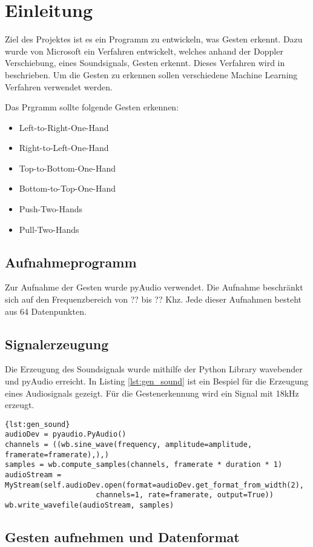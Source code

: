 \section{Einleitung}
Ziel des Projektes ist es ein Programm zu entwickeln, was Gesten erkennt. Dazu wurde von Microsoft ein Verfahren entwickelt, welches anhand der Doppler Verschiebung, eines Soundsignals, Gesten erkennt. Dieses Verfahren wird in \cite{Gupta2012} beschrieben. Um die Gesten zu erkennen sollen verschiedene Machine Learning Verfahren verwendet werden.

Das Prgramm sollte folgende Gesten erkennen:
\begin{itemize}
	\item Left-to-Right-One-Hand
	\item Right-to-Left-One-Hand
	\item Top-to-Bottom-One-Hand
	\item Bottom-to-Top-One-Hand
	\item Push-Two-Hands
	\item Pull-Two-Hands
\end{itemize}

\subsection{Aufnahmeprogramm}
Zur Aufnahme der Gesten wurde pyAudio verwendet. Die Aufnahme beschränkt sich auf den Frequenzbereich von ?? bis ?? Khz. Jede dieser Aufnahmen besteht aus 64 Datenpunkten. 

\subsection{Signalerzeugung}
Die Erzeugung des Soundsignals wurde mithilfe der Python Library wavebender und pyAudio erreicht. In Listing \ref{lst:gen_sound} ist ein Bespiel für die Erzeugung eines Audiosignals gezeigt. Für die Gestenerkennung wird ein Signal mit 18kHz erzeugt.

\begin{lstlisting}[caption={Erzeugung eines Soundsignals},label={lst:gen_sound}]{lst:gen_sound} 
audioDev = pyaudio.PyAudio()
channels = ((wb.sine_wave(frequency, amplitude=amplitude, framerate=framerate),),)
samples = wb.compute_samples(channels, framerate * duration * 1)
audioStream = MyStream(self.audioDev.open(format=audioDev.get_format_from_width(2),
					 channels=1, rate=framerate, output=True))
wb.write_wavefile(audioStream, samples)
\end{lstlisting}

\subsection{Gesten aufnehmen und Datenformat}
\label{sec:gestures_dataformat}

\nocite{Gupta2012}